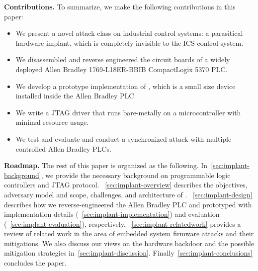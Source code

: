 \textbf{Contributions.} To summarize, we make the following contributions in this paper:
\begin{itemize}[leftmargin=*]
	\item We present a novel attack class on industrial control systems: a parasitical hardware implant, which is completely invisible to the ICS control system.
	\item We disassembled and reverse engineered the circuit boards of a widely deployed Allen Bradley 1769-L18ER-BBIB CompactLogix 5370 PLC. 
	\item We develop a prototype implementation of \name, which is a small size device installed inside the Allen Bradley PLC. 
	\item We write a JTAG driver that runs bare-metally on a microcontroller with minimal resource usage.
	\item We test and evaluate \name and conduct a synchronized attack with multiple controlled Allen Bradley PLCs. 
\end{itemize}


\textbf{Roadmap.} The rest of this paper is organized as the following. In~\autoref{sec:implant-background}, we provide the necessary background on programmable logic controllers and JTAG protocol. ~\autoref{sec:implant-overview} describes the objectives, adversary model and scope, challenges, and architecture of \name. ~\autoref{sec:implant-design} describes how we reverse-engineered the Allen Bradley PLC and prototyped \name with implementation details (~\autoref{sec:implant-implementation}) and evaluation (~\autoref{sec:implant-evaluation}), respectively. ~\autoref{sec:implant-relatedwork} provides a review of related work in the area of embedded system firmware attacks and their mitigations. We also discuss our views on the hardware backdoor and the possible mitigation strategies in~\autoref{sec:implant-discussion}. Finally~\autoref{sec:implant-conclusions} concludes the paper.


